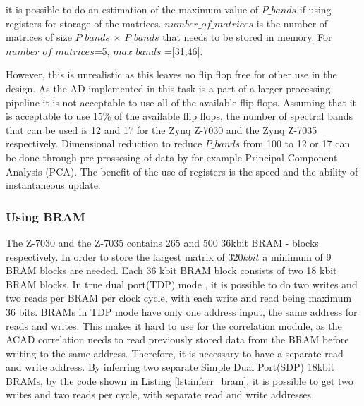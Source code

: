 it is possible to do an estimation of the maximum value of $P\_bands$ if using registers for storage of the matrices. $number\_of\_matrices$ is the number of matrices of size $P\_bands$ $\times$ $P\_bands$ that needs to be stored in memory. For $number\_of\_matrices$=5, $max\_bands$ =[31,46].


However, this is unrealistic as this leaves no flip flop free for other use in the design. As the AD implemented in this task is a part of a larger processing pipeline it is not acceptable to use all of the available flip flops. Assuming that it is acceptable to use 15\% of the available flip flops, the number of spectral bands that can be used is 12 and 17 for the Zynq Z-7030 and the Zynq Z-7035 respectively. Dimensional reduction to reduce $P\_bands$ from 100 to 12 or 17 can be done through pre-prossesing of data by for example Principal Component Analysis (PCA).
The benefit of the use of registers is the speed and the ability of instantaneous update. %



\subsubsection{Using BRAM}
The Z-7030 and the Z-7035 contains 265 and 500 $36$kbit BRAM - blocks respectively. In  order to store the largest matrix of $320 kbit$ a minimum of 9 BRAM blocks are needed. Each 36 kbit BRAM block consists of two 18 kbit BRAM blocks. In true dual port(TDP) mode \cite{cite:ug953}, it is possible to do two writes and two reads per BRAM per clock cycle, with each write and read being maximum 36 bits. BRAMs in TDP mode have only one address input, the same address for reads and writes. This makes it hard to use for the correlation module, as the ACAD correlation needs to read previously stored data from the BRAM before writing to the same address. Therefore, it is necessary to have a separate read and write address. By inferring two separate Simple Dual Port(SDP) 18kbit BRAMs, by the code shown in Listing \ref{lst:inferr_bram}, it is possible to get two writes and two reads per cycle, with separate read and write addresses.









